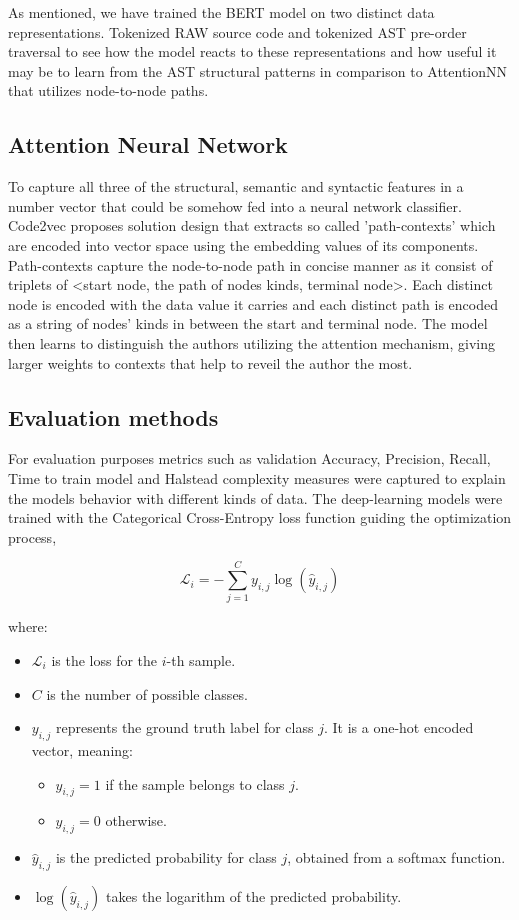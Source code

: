 \documentclass{article}
\begin{document}
As mentioned, we have trained the BERT model on two distinct data representations. Tokenized RAW source code and tokenized AST pre-order traversal
to see how the model reacts to these representations and how useful it may be to learn from the AST structural patterns in comparison to AttentionNN 
that utilizes node-to-node paths.

\subsection{Attention Neural Network}

To capture all three of the structural, semantic and syntactic features in a number vector that could be somehow fed into a neural network classifier. 
Code2vec \cite{code2vec} proposes solution design that extracts so called 'path-contexts' which are encoded into vector space using the embedding values 
of its components.
Path-contexts capture the node-to-node path in concise manner as it consist of triplets of <start node, the path of nodes kinds, terminal node>.
Each distinct node is encoded with the data value it carries and each distinct path is encoded as a string of nodes' kinds in between the start and terminal node.
The model then learns to distinguish the authors utilizing the attention mechanism, giving larger weights to contexts that help to reveil the author the most.

\subsection{Evaluation methods}
For evaluation purposes metrics such as validation Accuracy, Precision, Recall, Time to train model and Halstead complexity measures were captured to explain the models
behavior with different kinds of data. The deep-learning models were trained with the Categorical Cross-Entropy loss function guiding the optimization process,

\begin{equation}
    \mathcal{L}_i = - \sum_{j=1}^{C} y_{i,j} \log(\hat{y}_{i,j})
\end{equation}

where:
\begin{itemize}
    \item $\mathcal{L}_i$ is the loss for the $i$-th sample.
    \item $C$ is the number of possible classes.
    \item $y_{i,j}$ represents the ground truth label for class $j$. It is a one-hot encoded vector, meaning:
    \begin{itemize}
        \item $y_{i,j} = 1$ if the sample belongs to class $j$.
        \item $y_{i,j} = 0$ otherwise.
    \end{itemize}
    \item $\hat{y}_{i,j}$ is the predicted probability for class $j$, obtained from a softmax function.
    \item $\log(\hat{y}_{i,j})$ takes the logarithm of the predicted probability.
\end{itemize}
\end{document}
